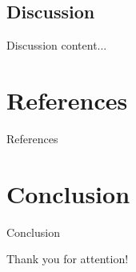 \documentclass[11pt, aspectratio= 169]{beamer}
\begin{document}
	\subsection{Discussion}
	\begin{frame}{Discussion}
		content...
	\end{frame}
	
	\section{References}
	\begin{frame}{References}
		
		
	\end{frame}
	
	\section{Conclusion}
	\begin{frame}{Conclusion}
		\begin{center}
			\LARGE
			Thank you for attention!
		\end{center}
	\end{frame}
\end{document}
